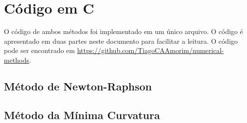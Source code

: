 \documentclass[final,3p,12pt]{elsarticle}
\begin{document}




\newpage
\FloatBarrier
\section{Código em C}

O código de ambos métodos foi implementado em um único arquivo. O código é apresentado em duas partes neste documento para facilitar a leitura. O código pode ser encontrado em \href{https://github.com/TiagoCAAmorim/numerical-methods}{https://github.com/TiagoCAAmorim/numerical-methods}.

\subsection{Método de Newton-Raphson}
% 

\subsection{Método da Mínima Curvatura}
% 
\end{document}
